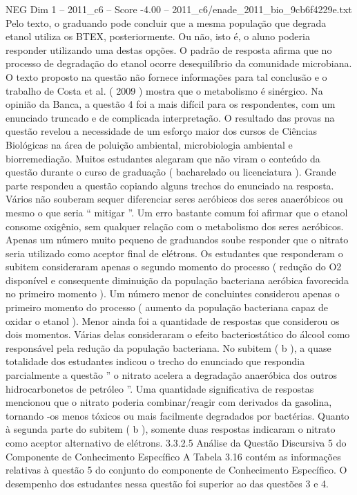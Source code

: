 \begin{textsample}{NEG Dim 1 – 2011\_c6 – Score -4.00 – 2011\_c6/enade\_2011\_bio\_9cb6f4229e.txt}
Pelo texto, o graduando pode concluir que a mesma população que degrada etanol utiliza os BTEX, posteriormente.
Ou não, isto é, o aluno poderia responder utilizando uma destas opções.
O padrão de resposta afirma que no processo de degradação do etanol ocorre desequilíbrio da comunidade microbiana.
O texto proposto na questão não fornece informações para tal conclusão e o trabalho de Costa et al. ( 2009 ) mostra que o metabolismo é sinérgico.
Na opinião da Banca, a questão 4 foi a mais difícil para os respondentes, com um enunciado truncado e de complicada interpretação.
O resultado das provas na questão revelou a necessidade de um esforço maior dos cursos de Ciências Biológicas na área de poluição ambiental, microbiologia ambiental e biorremediação.
Muitos estudantes alegaram que não viram o conteúdo da questão durante o curso de graduação ( bacharelado ou licenciatura ).
Grande parte respondeu a questão copiando alguns trechos do enunciado na resposta.
Vários não souberam sequer diferenciar seres aeróbicos dos seres anaeróbicos ou mesmo o que seria “ mitigar ”.
Um erro bastante comum foi afirmar que o etanol consome oxigênio, sem qualquer relação com o metabolismo dos seres aeróbicos.
Apenas um número muito pequeno de graduandos soube responder que o nitrato seria utilizado como aceptor final de elétrons.
Os estudantes que responderam o subitem consideraram apenas o segundo momento do processo ( redução do O2 disponível e consequente diminuição da população bacteriana aeróbica favorecida no primeiro momento ).
Um número menor de concluintes considerou apenas o primeiro momento do processo ( aumento da população bacteriana capaz de oxidar o etanol ).
Menor ainda foi a quantidade de respostas que considerou os dois momentos.
Várias delas consideraram o efeito bacteriostático do álcool como responsável pela redução da população bacteriana.
No subitem ( b ), a quase totalidade dos estudantes indicou o trecho do enunciado que respondia parcialmente a questão ” o nitrato acelera a degradação anaeróbica dos outros hidrocarbonetos de petróleo ”.
Uma quantidade significativa de respostas mencionou que o nitrato poderia combinar/reagir com derivados da gasolina, tornando -os menos tóxicos ou mais facilmente degradados por bactérias.
Quanto à segunda parte do subitem ( b ), somente duas respostas indicaram o nitrato como aceptor alternativo de elétrons. 3.3.2.5 Análise da Questão Discursiva 5 do Componente de Conhecimento Específico A Tabela 3.16 contém as informações relativas à questão 5 do conjunto do componente de Conhecimento Específico.
O desempenho dos estudantes nessa questão foi superior ao das questões 3 e 4.

\end{textsample}
